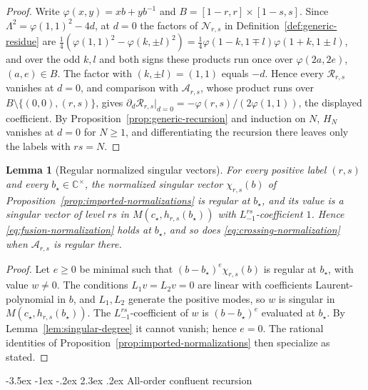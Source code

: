 \documentclass[twoside,10pt]{article}
\makeatletter
\numberwithin{equation}{section}
\theoremstyle{slbody}
\newtheorem{lemma}[theorem]{Lemma}
\theoremstyle{definition}
\theoremstyle{remark}
\renewcommand{\section}{%
  \@startsection{section}{1}{\z@}%
    {-3.5ex \@plus -1ex \@minus -.2ex}%
    {2.3ex \@plus .2ex}%
    {\normalfont\large\bfseries}}
\makeatother
\begin{document}
\begin{proof}
Write \(\varphi(x,y)=xb+yb^{-1}\) and \(B=[1-r,r]\times[1-s,s]\).  Since
\(\Lambda^2=\varphi(1,1)^2-4d\), at \(d=0\) the factors of
\({\mathcal N}_{r,s}\) in Definition~\ref{def:generic-residue} are
\(\frac14(\varphi(1,1)^2-\varphi(k,\pm l)^2)
=\frac14\varphi(1-k,1\mp l)\varphi(1+k,1\pm l)\), and over the odd \(k,l\) and
both signs these products run once over \(\varphi(2a,2e)\),
\((a,e)\in B\).  The factor with \((k,\pm l)=(1,1)\) equals \(-d\).  Hence
every \({\mathcal R}_{r,s}\) vanishes at \(d=0\), and comparison with
\({\mathcal A}_{r,s}\), whose product runs over
\(B\setminus\{(0,0),(r,s)\}\), gives
\(\partial_d{\mathcal R}_{r,s}|_{d=0}=-\varphi(r,s)/(2\varphi(1,1))\), the
displayed coefficient.  By Proposition~\ref{prop:generic-recursion} and
induction on \(N\), \(H_N\) vanishes at \(d=0\) for \(N\geq1\), and
differentiating the recursion there leaves only the labels with \(rs=N\).
\end{proof}

\begin{lemma}[Regular normalized singular vectors]
\label{lem:regular-everywhere}
For every positive label \((r,s)\) and every \(b_\star\in\mathbb C^\times\),
the normalized singular vector \(\chi_{r,s}(b)\) of
Proposition~\ref{prop:imported-normalizations} is regular at \(b_\star\),
and its value is a singular vector of level \(rs\) in
\(M(c_\star,h_{r,s}(b_\star))\) with \(L_{-1}^{rs}\)-coefficient \(1\).
Hence \eqref{eq:fusion-normalization} holds at \(b_\star\), and so does
\eqref{eq:crossing-normalization} when \({\mathcal A}_{r,s}\) is regular
there.
\end{lemma}

\begin{proof}
Let \(e\geq0\) be minimal such that \((b-b_\star)^e\chi_{r,s}(b)\) is
regular at \(b_\star\), with value \(w\neq0\).  The conditions
\(L_1v=L_2v=0\) are linear with coefficients Laurent-polynomial in \(b\), and
\(L_1,L_2\) generate the positive modes, so \(w\) is singular in
\(M(c_\star,h_{r,s}(b_\star))\).  The \(L_{-1}^{rs}\)-coefficient of \(w\) is
\((b-b_\star)^e\) evaluated at \(b_\star\).  By Lemma~\ref{lem:singular-degree} it
cannot vanish; hence \(e=0\).  The rational identities of
Proposition~\ref{prop:imported-normalizations} then specialize as stated.
\end{proof}


\section{All-order confluent recursion}\label{sec:all-order}
\end{document}
